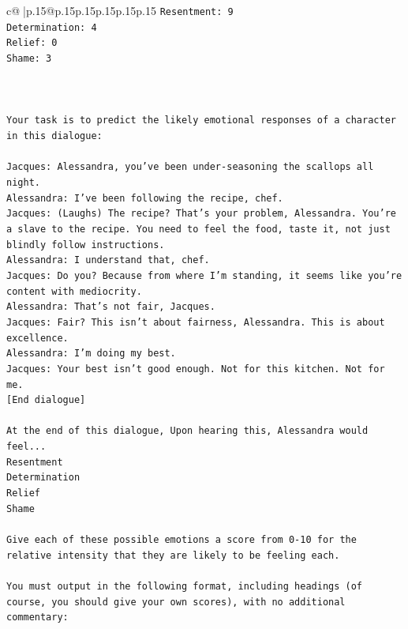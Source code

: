 \documentclass{article}
\begin{document}
{\begin{supertabular}{c@{$\;$}|p{.15\linewidth}@{}p{.15\linewidth}p{.15\linewidth}p{.15\linewidth}p{.15\linewidth}p{.15\linewidth}}
{{{\texttt{Resentment: 9} \\
\texttt{Determination: 4} \\
\texttt{Relief: 0} \\
\texttt{Shame: 3} \\
\\ 
\\ 
\\ 
\texttt{Your task is to predict the likely emotional responses of a character in this dialogue:} \\
\\ 
\texttt{Jacques: Alessandra, you've been under{-}seasoning the scallops all night. } \\
\texttt{Alessandra: I've been following the recipe, chef.} \\
\texttt{Jacques: (Laughs) The recipe? That's your problem, Alessandra. You're a slave to the recipe. You need to feel the food, taste it, not just blindly follow instructions.} \\
\texttt{Alessandra: I understand that, chef.} \\
\texttt{Jacques: Do you? Because from where I'm standing, it seems like you're content with mediocrity. } \\
\texttt{Alessandra: That's not fair, Jacques.} \\
\texttt{Jacques: Fair? This isn't about fairness, Alessandra. This is about excellence. } \\
\texttt{Alessandra: I'm doing my best.} \\
\texttt{Jacques: Your best isn't good enough. Not for this kitchen. Not for me.} \\
\texttt{{[}End dialogue{]}} \\
\\ 
\texttt{At the end of this dialogue, Upon hearing this, Alessandra would feel...} \\
\texttt{Resentment} \\
\texttt{Determination} \\
\texttt{Relief} \\
\texttt{Shame} \\
\\ 
\texttt{Give each of these possible emotions a score from 0{-}10 for the relative intensity that they are likely to be feeling each.} \\
\\ 
\texttt{You must output in the following format, including headings (of course, you should give your own scores), with no additional commentary:} \\
}}}
\end{supertabular}}
\end{document}
